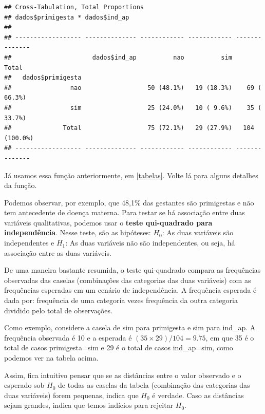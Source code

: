 \documentclass[
]{book}
\newenvironment{Shaded}{\begin{snugshade}}{\end{snugshade}}
\newcommand{\DataTypeTok}[1]{\textcolor[rgb]{0.13,0.29,0.53}{#1}}
\newcommand{\KeywordTok}[1]{\textcolor[rgb]{0.13,0.29,0.53}{\textbf{#1}}}
\newcommand{\NormalTok}[1]{#1}
\newcommand{\OperatorTok}[1]{\textcolor[rgb]{0.81,0.36,0.00}{\textbf{#1}}}
\newcommand{\StringTok}[1]{\textcolor[rgb]{0.31,0.60,0.02}{#1}}
\begin{document}
\begin{Shaded}
\end{Shaded}

\begin{verbatim}
## Cross-Tabulation, Total Proportions  
## dados$primigesta * dados$ind_ap  
## 
## ------------------ -------------- ------------ ------------ --------------
##                      dados$ind_ap          nao          sim          Total
##   dados$primigesta                                                        
##                nao                  50 (48.1%)   19 (18.3%)    69 ( 66.3%)
##                sim                  25 (24.0%)   10 ( 9.6%)    35 ( 33.7%)
##              Total                  75 (72.1%)   29 (27.9%)   104 (100.0%)
## ------------------ -------------- ------------ ------------ --------------
\end{verbatim}

Já usamos essa função anteriormente, em \ref{tabelas}. Volte lá para alguns detalhes da função.

Podemos observar, por exemplo, que 48,1\% das gestantes são primigestas e não tem antecedente de doença materna. Para testar se há associação entre duas variáveis qualitativas, podemos usar o \textbf{teste qui-quadrado para independência}. Nesse teste,
são as hipóteses: \(H_0\): As duas variáveis são independentes e \(H_1\): As duas variáveis não são independentes, ou seja, há associação entre as duas variáveis.

De uma maneira bastante resumida, o teste qui-quadrado compara as frequências observadas das caselas (combinações das categorias das duas variáveis) com as frequências esperadas em um cenário de independência. A frequência esperada é dada por: frequência de uma categoria vezes frequência da outra categoria dividido pelo total de observações.

Como exemplo, considere a casela de sim para primigesta e sim para ind\_ap. A frequência observada é 10 e a esperada é \((35 \times 29)/104= 9.75\), em que 35 é o total de casos primigesta=sim e 29 é o total de casos ind\_ap=sim, como podemos ver na tabela acima.

Assim, fica intuitivo pensar que se as distâncias entre o valor observado e o esperado sob \(H_0\) de todas as caselas da tabela (combinação das categorias das duas variáveis) forem pequenas, indica que \(H_0\) é verdade. Caso as distâncias sejam grandes, indica que temos indícios para rejeitar \(H_0\).
\end{document}
